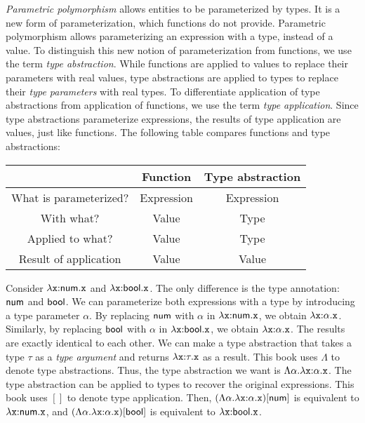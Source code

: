 \textit{Parametric polymorphism}
allows entities to be parameterized by types. It is a new form of
parameterization, which functions do not provide. Parametric polymorphism allows
parameterizing an expression with a type, instead of a value. To distinguish this
new notion of parameterization from functions, we use the term \textit{type
abstraction}. While functions are applied to values to
replace their parameters with real values, type abstractions are applied to
types to replace their \textit{type parameters} with real
types. To differentiate application of type abstractions from application of
functions, we use the term \textit{type application}.
Since type abstractions parameterize expressions, the results of type application
are values, just like functions.
The following table compares functions and type abstractions:
\begin{center}
\begin{tabular}{c|c|c}
  & Function & Type abstraction \\\hline
  What is parameterized? & Expression & Expression \\
  With what? & Value & Type \\
  Applied to what? & Value & Type \\
  Result of application & Value & Value \\
\end{tabular}
\end{center}

Consider $\lambda\texttt{x}{:}\textsf{num}.\texttt{x}$ and $\lambda\texttt{x}{:}\textsf{bool}.\texttt{x}$.
The only difference is the type annotation: $\textsf{num}$ and $\textsf{bool}$.
We can parameterize both expressions with a type by introducing a type parameter
$\alpha$. By replacing $\textsf{num}$ with $\alpha$ in $\lambda\texttt{x}{:}\textsf{num}.\texttt{x}$, we
obtain $\lambda\texttt{x}{:}\alpha.\texttt{x}$. Similarly, by replacing $\textsf{bool}$
with $\alpha$ in $\lambda\texttt{x}{:}\textsf{bool}.\texttt{x}$, we obtain
$\lambda\texttt{x}{:}\alpha.\texttt{x}$. The results are exactly identical to each other.
We can make a type abstraction that takes a type $\tau$ as a \textit{type
argument} and returns $\lambda\texttt{x}{:}\tau.\texttt{x}$ as a result.
This book uses $\Lambda$ to denote type abstractions. Thus, the type abstraction
we want is $\Lambda\alpha.\lambda\texttt{x}{:}\alpha.\texttt{x}$. The type abstraction can
be applied to types to recover the original expressions. This book uses $[]$ to
denote type application. Then,
$(\Lambda\alpha.\lambda\texttt{x}{:}\alpha.\texttt{x})[\textsf{num}]$ is equivalent to
$\lambda\texttt{x}{:}\textsf{num}.\texttt{x}$, and
$(\Lambda\alpha.\lambda\texttt{x}{:}\alpha.\texttt{x})[\textsf{bool}]$ is equivalent to
$\lambda\texttt{x}{:}\textsf{bool}.\texttt{x}$.


